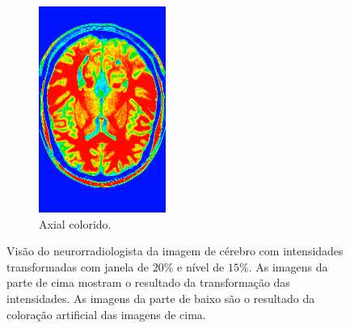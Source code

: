 \documentclass{article}
\begin{document}
\begin{figure}[h]
\begin{subfigure}[b]{0.3\textwidth}
        \includegraphics[width=\textwidth]{brain/neuroradiologist-axial.png}
        \caption{Axial colorido.}
    \end{subfigure}
    \caption{Visão do neurorradiologista da imagem de cérebro com intensidades transformadas com janela de $20\%$ e nível de $15\%$. As imagens da parte de cima mostram o resultado da transformação das intensidades. As imagens da parte de baixo são o resultado da coloração artificial das imagens de cima.}
    \label{fig:brain-visao-neurorradiologista-cores}
\end{figure}
\end{document}
